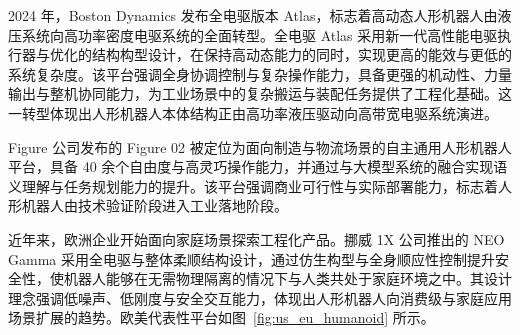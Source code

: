 2024 年，Boston Dynamics 发布全电驱版本 Atlas，标志着高动态人形机器人由液压系统向高功率密度电驱系统的全面转型\cite{BostonDynamics2024Atlas}。全电驱 Atlas 采用新一代高性能电驱执行器与优化的结构构型设计，在保持高动态能力的同时，实现更高的能效与更低的系统复杂度。该平台强调全身协调控制与复杂操作能力，具备更强的机动性、力量输出与整机协同能力，为工业场景中的复杂搬运与装配任务提供了工程化基础。这一转型体现出人形机器人本体结构正由高功率液压驱动向高带宽电驱系统演进。

Figure 公司发布的 Figure 02 被定位为面向制造与物流场景的自主通用人形机器人平台，具备 40 余个自由度与高灵巧操作能力，并通过与大模型系统的融合实现语义理解与任务规划能力的提升\cite{FigureAI2024}。该平台强调商业可行性与实际部署能力，标志着人形机器人由技术验证阶段进入工业落地阶段。

近年来，欧洲企业开始面向家庭场景探索工程化产品。挪威 1X 公司推出的 NEO Gamma 采用全电驱与整体柔顺结构设计\cite{1X2024NeoGamma}，通过仿生构型与全身顺应性控制提升安全性，使机器人能够在无需物理隔离的情况下与人类共处于家庭环境之中。其设计理念强调低噪声、低刚度与安全交互能力，体现出人形机器人向消费级与家庭应用场景扩展的趋势。欧美代表性平台如图~\ref{fig:us_eu_humanoid} 所示。

